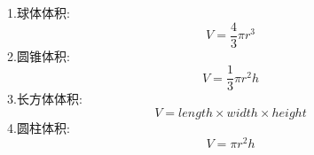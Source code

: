 \documentclass[UTF8, fontset=ubuntu]{ctexart}
\begin{document}
1.球体体积:\\
\[V=\frac{4}{3}\pi r^3\]
2.圆锥体积:\\
\[V=\frac{1}{3}\pi r^2h\]
3.长方体体积:\\
\[V=length\times width\times height\]
4.圆柱体积:\\
\[V=\pi r^2h\]
\end{document}
